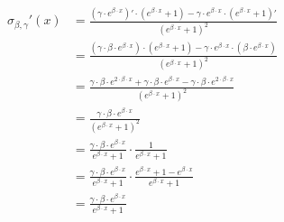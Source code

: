 \documentclass{article}
\begin{document}
          \begin{align*}
            \sigma_{\beta, \gamma}' (x)
              & = \frac{
                    \left( \gamma \cdot e^{\beta \cdot x} \right)'
                    \cdot
                    \left(e^{\beta \cdot x} + 1 \right)
                    -
                    \gamma
                    \cdot
                    e^{\beta \cdot x}
                    \cdot
                    \left(e^{\beta \cdot x} + 1 \right)'
                  }{
                    \left(e^{\beta \cdot x} + 1 \right)^2
                  } \\
              & = \frac{
                    \left( \gamma \cdot \beta \cdot e^{\beta \cdot x} \right)
                    \cdot
                    \left(e^{\beta \cdot x} + 1 \right)
                    -
                    \gamma
                    \cdot
                    e^{\beta \cdot x}
                    \cdot
                    \left( \beta \cdot e^{\beta \cdot x} \right)
                  }{
                    \left(e^{\beta \cdot x} + 1 \right)^2
                  } \\
              & = \frac{
                    \gamma \cdot \beta \cdot e^{2 \cdot \beta \cdot x}
                    +
                    \gamma \cdot \beta \cdot e^{\beta \cdot x}
                    -
                    \gamma \cdot \beta \cdot e^{2 \cdot \beta \cdot x}
                  }{
                    \left(e^{\beta \cdot x} + 1 \right)^2
                  } \\
              & = \frac{
                    \gamma \cdot \beta \cdot e^{\beta \cdot x}
                  }{
                    \left(e^{\beta \cdot x} + 1 \right)^2
                  } \\
              & = \frac{
                    \gamma \cdot \beta \cdot e^{\beta \cdot x}
                  }{
                    e^{\beta \cdot x} + 1
                  }
                  \cdot
                  \frac{1}{e^{\beta \cdot x} + 1} \\
              & = \frac{
                    \gamma \cdot \beta \cdot e^{\beta \cdot x}
                  }{
                    e^{\beta \cdot x} + 1
                  }
                  \cdot
                  \frac{
                    e^{\beta \cdot x} + 1 - e^{\beta \cdot x}
                  }{
                    e^{\beta \cdot x} + 1
                  } \\
              & = \frac{
                    \gamma \cdot \beta \cdot e^{\beta \cdot x}
                  }{
                    e^{\beta \cdot x} + 1
}
\end{align*}
\end{document}
